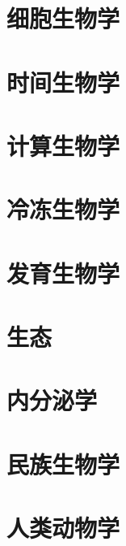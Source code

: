 \section{细胞生物学}
\section{时间生物学}
\section{计算生物学}
\section{冷冻生物学}
\section{发育生物学}
\section{生态}
\section{内分泌学}
\section{民族生物学}
\section{人类动物学}
